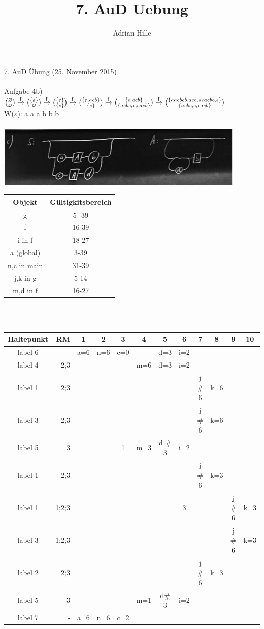 \documentclass{scrartcl}
\title{7. AuD Uebung}
\author{Adrian Hille}
\begin{document}
\Large 7. AuD \"Ubung (25. November 2015)\\
\\
\normalsize
Aufgabe 4b)\\
$\binom{\varnothing}{\varnothing} \xmapsto{\text{f}}
 \binom{\{\varepsilon \}}{\varnothing} \xmapsto{\text{f}}
 \binom{\{\varepsilon \}}{\{ c\}} \xmapsto{\text{f}}
 \binom{\{ \varepsilon , acb\}}{\{c\}} \xmapsto{\text{f}}
 \binom{\{ \epsilon, acb\}}{\{acbc,c,cacb\}} \xmapsto{\text{f}}
 \binom{\{ aacbcb,acb,acacbb, \epsilon\}}{\{acbc,c,cacb\}}$\\

W($\varepsilon$): a a a b b b \\
\\
\includegraphics{syntax01.jpg}
\\

\begin{tabular}[c]{c|c}
	Objekt & G\"ultigkitsbereich\\
	\hline
	g & 5 -39\\
	\hline
	f & 16-39\\
	\hline
	i in f & 18-27\\
	\hline
	a (global) & 3-39\\
	\hline
	n,c in main & 31-39\\
	\hline
	j,k in g & 5-14\\
	\hline
	m,d in f & 16-27\\
\end{tabular}
\\
\\
\begin{tabular}[c]{c|r|c|c|c|c|c|c|c|c|c|c}
	Haltepunkt & RM & 1 & 2 & 3 & 4 & 5 & 6 & 7 & 8 & 9 & 10\\
	\hline
	label 6 & - & a=6 & n=6 & c=0 &  & d=3 & i=2 &  &  &  & \\
	\hline
	label 4 & 2;3 &  &  &  & m=6 & d=3 & i=2 &  &  &  & \\
	\hline
	label 1 & 2;3 &  &  &  &  &  &  & j $\#$6  & k=6 &  & \\
	\hline
	label 3 & 2;3 &  &  &  &  &  &  & j $\#$6  & k=6 &  & \\
	\hline
	label 5 & 3 &  &  & 1 & m=3 & d $\#$3 & i=2 &  &  &  & \\
	\hline
	label 1 & 2;3 &  &  &  &  &  &  & j $\#$6  & k=3 &  & \\
	\hline
	label 1 & 1;2;3 &  &  &  &  &  & 3 &  &  & j $\#$6 & k=3 \\
	\hline
	label 3 & 1;2;3 &  &  &  &  &  &  &  &  & j $\#$6 & k=3 \\
	\hline
	label 2 & 2;3 &  &  &  &  &  &  &j $\#$6  & k=3 &  &  \\
	\hline
	label 5 & 3 &  &  &  & m=1 & d$\#$3 & i=2 &  &  &  & \\
	\hline
	label 7 & - & a=6 & n=6 & c=2 &  &  &  &  &  &  & \\
\end{tabular}
\end{document}
